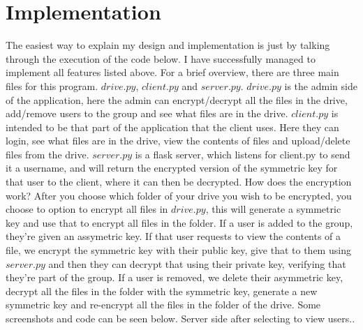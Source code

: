 \documentclass[12pt]{report}
\begin{document}
\section{Implementation}
The easiest way to explain my design and implementation is just by talking through the execution of the code below. I have successfully managed to implement all features listed above. 
\newline
For a brief overview, there are three main files for this program. $drive.py$, $client.py$ and $server.py$.
\newline
\newline
$drive.py$ is the admin side of the application, here the admin can encrypt/decrypt all the files in the drive, add/remove users to the group and see what files are in the drive.
\newline
\newline
$client.py$ is intended to be that part of the application that the client uses. Here they can login, see what files are in the drive, view the contents of files and upload/delete files from the drive.
\newline
\newline
$server.py$ is a flask server, which listens for client.py to send it a username, and will return the encrypted version of the symmetric key for that user to the client, where it can then be decrypted.
\newline
\newline
How does the encryption work? After you choose which folder of your drive you wish to be encrypted, you choose to option to encrypt all files in $drive.py$, this will generate a symmetric key and use that to encrypt all files in the folder. If a user is added to the group, they're given an assymetric key. If that user requests to view the contents of a file, we encrypt the symmetric key with their public key, give that to them using $server.py$ and then they can decrypt that using their private key, verifying that they're part of the group. If a user is removed, we delete their asymmetric key, decrypt all the files in the folder with the symmetric key, generate a new symmetric key and re-encrypt all the files in the folder of the drive.
\newline
\newline
Some screenshots and code can be seen below.
\newline
Server side after selecting to view users..
\end{document}
